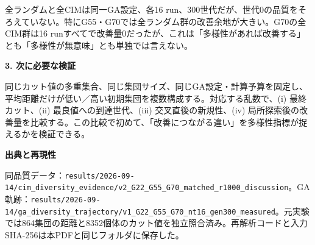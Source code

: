 \documentclass[11pt,a4paper,landscape]{article}
\begin{document}
全ランダムと全CIMは同一GA設定、各16 run、300世代だが、世代0の品質をそろえていない。特にG55・G70では全ランダム群の改善余地が大きい。G70の全CIM群は16 runすべてで改善量0だったが、これは「多様性があれば改善する」とも「多様性が無意味」とも単独では言えない。

\textbf{3. 次に必要な検証}

同じカット値の多重集合、同じ集団サイズ、同じGA設定・計算予算を固定し、平均距離だけが低い／高い初期集団を複数構成する。対応する乱数で、(i) 最終カット、(ii) 最良値への到達世代、(iii) 交叉直後の新規性、(iv) 局所探索後の改善量を比較する。この比較で初めて、「改善につながる違い」を多様性指標が捉えるかを検証できる。

\textbf{出典と再現性}

同品質データ：\texttt{results/2026-09-14/cim\_diversity\_evidence/v2\_G22\_G55\_G70\_matched\_r1000\_discussion}。GA軌跡：\texttt{results/2026-09-14/ga\_diversity\_trajectory/v1\_G22\_G55\_G70\_nt16\_gen300\_measured}。元実験では864集団の距離と8352個体のカット値を独立照合済み。再解析コードと入力SHA-256は本PDFと同じフォルダに保存した。
\end{document}

